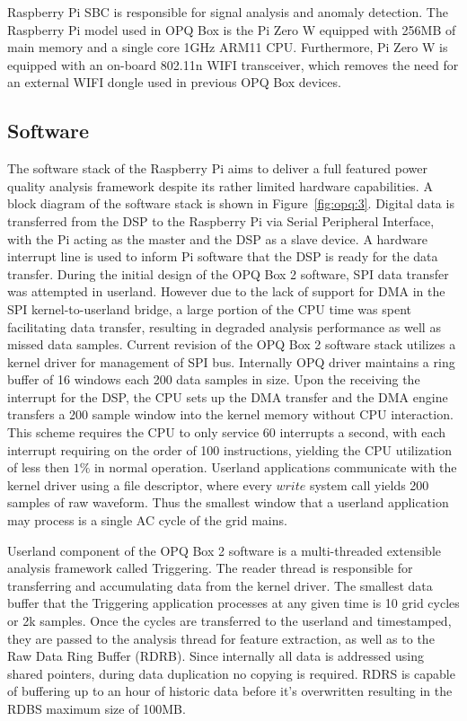 Raspberry Pi SBC is responsible for signal analysis and anomaly detection.
The Raspberry Pi model used in OPQ Box is the Pi Zero W equipped with 256MB of main memory and a single core 1GHz ARM11 CPU. Furthermore, Pi Zero W is equipped with an on-board 802.11n WIFI transceiver, which removes the need for an external WIFI dongle used in previous OPQ Box devices.
\subsection{Software}\label{subsec:software}
The software stack of the Raspberry Pi aims to deliver a full featured power quality analysis framework despite its rather limited hardware capabilities.
A block diagram of the software stack is shown in Figure~\ref{fig:opq:3}.
Digital data is transferred from the DSP to the Raspberry Pi via Serial Peripheral Interface, with the Pi acting as the master and the DSP as a slave device.
A hardware interrupt line is used to inform Pi software that the DSP is ready for the data transfer.
During the initial design of the OPQ Box 2 software, SPI data transfer was attempted in userland.
However due to the lack of support for DMA in the SPI kernel-to-userland bridge, a large portion of the CPU time was spent facilitating data transfer, resulting in degraded analysis performance as well as missed data samples.
Current revision of the OPQ Box 2 software stack utilizes a kernel driver for management of SPI bus.
Internally OPQ driver maintains a ring buffer of 16 windows each 200 data samples in size.
Upon the receiving the interrupt for the DSP, the CPU sets up the DMA transfer and the DMA engine transfers a 200 sample window into the kernel memory without CPU interaction.
This scheme requires the CPU to only service 60 interrupts a second, with each interrupt requiring on the order of 100 instructions, yielding the CPU utilization of less then $1\%$ in normal operation.
Userland applications communicate with the kernel driver using a file descriptor, where every $write$ system call yields 200 samples of raw waveform.
Thus the smallest window that a userland application may process is a single AC cycle of the grid mains.

Userland component of the OPQ Box 2 software is a multi-threaded extensible analysis framework called Triggering.
The reader thread is responsible for transferring and accumulating data from the kernel driver.
The smallest data buffer that the Triggering application processes at any given time is 10 grid cycles or 2k samples.
Once the cycles are transferred to the userland and timestamped, they are passed to the analysis thread for feature extraction, as well as to the Raw Data Ring Buffer (RDRB).
Since internally all data is addressed using shared pointers, during data duplication no copying is required.
RDRS is capable of buffering up to an hour of historic data before it's overwritten resulting in the RDBS maximum size of 100MB.

